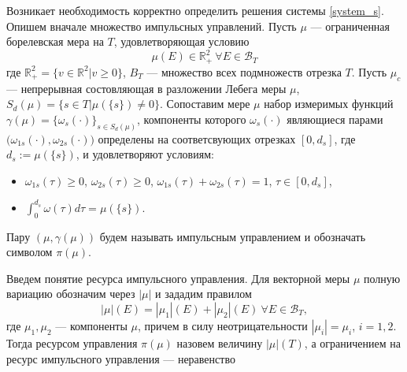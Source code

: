 
Возникает необходимость корректно определить решения системы
\eqref{system_s}. Опишем вначале множество импульсных управлений. Пусть $\mu$ ---
ограниченная борелевская мера на $T$, удовлетворяющая условию
\begin{equation*}
  \mu(E) \in \mathbb{R}_+^2 \ \forall E \in \mathcal{B}_T
\end{equation*}
где $\mathbb{R}_+^2 = \{v \in \mathbb{R}^2 | v \ge 0\}$, $B_T$ ---
множество всех подмножеств отрезка $T$. Пусть $\mu_c$ --- непрерывная
состовляющая в разложении Лебега меры $\mu$, $S_d(\mu) = \{ s \in T |
\mu(\{s\}) \neq 0\}$. Сопоставим мере $\mu$ набор измеримых функций
$\gamma(\mu) = \{ \omega_s(\cdot) \}_{s\in S_d(\mu)}$, компоненты
которого $\omega_s(\cdot)$ являющиеся парами
$\big(\omega_{1s}(\cdot),\omega_{2s}(\cdot)\big)$ определены на
соответсвующих отрезках $[0,d_s]$, где $d_s := \mu(\{s\})$, и
удовлетворяют условиям:
\begin{itemize}
  \item $\omega_{1s}(\tau) \ge 0$, $\omega_{2s}(\tau) \ge 0$, 
    $\omega_{1s}(\tau) + \omega_{2s}(\tau) = 1$, $\tau \in [0,d_s]$,
  \item $\displaystyle\int_{0}^{d_s} \omega(\tau) d\tau = \mu(\{s\})$.
\end{itemize}
Пару $(\mu,\gamma(\mu))$ будем называть импульсным управлением и
обозначать символом $\pi(\mu)$.

Введем понятие ресурса импульсного управления. Для векторной меры
$\mu$ полную вариацию обозначим через $|\mu|$ и зададим правилом
\begin{equation*}
  |\mu|(E) = |\mu_1|(E) + |\mu_2|(E) \ \forall E \in \mathcal{B}_T,
\end{equation*}
где $\mu_1,\mu_2$ --- компоненты $\mu$, причем в силу
неотрицательности $|\mu_i| = \mu_i$, $i=1,2$. Тогда ресурсом
управления $\pi(\mu)$ назовем величину $|\mu|(T)$, а ограничением на
ресурс импульсного управления --- неравенство

